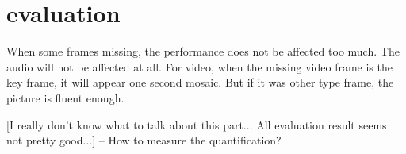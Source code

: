 \section{evaluation} %
\label{sec:evaluation}
When some frames missing, the performance does not be affected too much. The audio will not be affected at all. For video, when the missing video frame is the key frame, it will appear one second mosaic. But if it was other type frame, the picture is fluent enough.

[I really don't know what to talk about this part... All evaluation result seems not pretty good...] -- How to measure the quantification?

